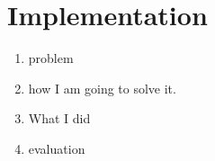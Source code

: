 \section{Implementation}

\begin{enumerate}
\item problem 
\item how I am going to solve it.
\item What I did
\item evaluation
\end{enumerate}
    